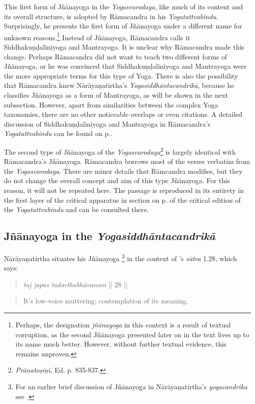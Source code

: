 This first form of Jñānayoga in the \textit{Yogasvarodaya}, like much of its content and its overall structure, is adopted by Rāmacandra in his \textit{Yogatattvabindu}. Surprisingly, he presents the first form of Jñānayoga under a different name for unknown reasons.\footnote{Perhaps, the designation \textit{jñānayoga} in this context is a result of textual corruption, as the second Jñānayoga presented later on in the text lives up to its name much better. However, without further textual evidence, this remains unproven.} Instead of Jñānayoga, Rāmacandra calls it Siddhakuṇḍaliniyoga and Mantrayoga. It is unclear why Rāmacandra made this change. Perhaps Rāmacandra did not want to teach two different forms of Jñānayoga, or he was convinced that Siddhakuṇḍaliniyoga and Mantrayoga were the more appropriate terms for this type of Yoga. There is also the possibility that Rāmacandra knew Nārāyaṇatīrtha's \emph{Yogasiddhāntacandrikā}, because he classifies Jñānayoga as a form of Mantrayoga, as will be shown in the next subsection. However, apart from similarities between the complex Yoga taxonomies, there are no other noticeable overlaps or even citations. A detailed discussion of Siddhakuṇḍalinīyoga and Mantrayoga in Rāmacandra's \textit{Yogatattvabindu} can be found on p.\pageref{siddhayogaintro}.

The second type of Jñānayoga of the \emph{Yogasvarodaya}\footnote{\textit{Prāṇatoṣiṇī}, Ed. p. 835-837.} is largely identical with Rāmacandra's Jñānayoga. Rāmacandra borrows most of the verses verbatim from the \textit{Yogasvarodaya}. There are minor details that Rāmcandra modifies, but they do not change the overall concept and aim of this type Jñānayoga. For this reason, it will not be repeated here. The passage is reproduced in its entirety in the first layer of the critical apparatus in section  on p. \pageref{jnanayogastart} of the critical edition of the \textit{Yogatattvabindu} and can be consulted there.   

\subsection{Jñānayoga in the \textit{Yogasiddhāntacandrikā}}
\label{jnanayogaintrocandrika}
Nārāyaṇatīrtha situates his Jñānayoga \footnote{For an earlier brief discussion of Jñānayoga in Nārāyaṇatīrtha's \textit{yogacandrika} see \citeauthor[2004: 76]{penna2004}.} in the context of 's \textit{sūtra} 1.28, which says:
\begin{quote} \textit{taj japas tadarthabhāvanam} || 28 || \end{quote}
\begin{quote} It's low-voice muttering; contemplation of its meaning. \end{quote}

